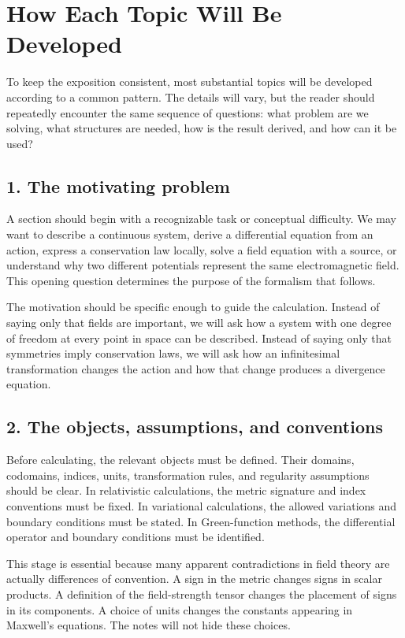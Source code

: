 \section*{How Each Topic Will Be Developed}

To keep the exposition consistent, most substantial topics will be developed according to a common pattern. The details will vary, but the reader should repeatedly encounter the same sequence of questions: what problem are we solving, what structures are needed, how is the result derived, and how can it be used?

\subsection*{1. The motivating problem}

A section should begin with a recognizable task or conceptual difficulty. We may want to describe a continuous system, derive a differential equation from an action, express a conservation law locally, solve a field equation with a source, or understand why two different potentials represent the same electromagnetic field. This opening question determines the purpose of the formalism that follows.

The motivation should be specific enough to guide the calculation. Instead of saying only that fields are important, we will ask how a system with one degree of freedom at every point in space can be described. Instead of saying only that symmetries imply conservation laws, we will ask how an infinitesimal transformation changes the action and how that change produces a divergence equation.

\subsection*{2. The objects, assumptions, and conventions}

Before calculating, the relevant objects must be defined. Their domains, codomains, indices, units, transformation rules, and regularity assumptions should be clear. In relativistic calculations, the metric signature and index conventions must be fixed. In variational calculations, the allowed variations and boundary conditions must be stated. In Green-function methods, the differential operator and boundary conditions must be identified.

This stage is essential because many apparent contradictions in field theory are actually differences of convention. A sign in the metric changes signs in scalar products. A definition of the field-strength tensor changes the placement of signs in its components. A choice of units changes the constants appearing in Maxwell's equations. The notes will not hide these choices.

